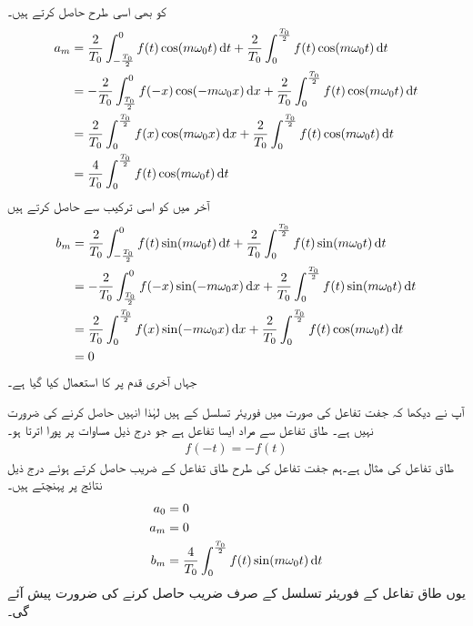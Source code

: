  کو بھی اسی طرح حاصل کرتے ہیں۔
\begin{gather}
\begin{aligned}
a_m&=\frac{2}{T_0}\int_{-\frac{T_0}{2}}^{0}f(t) \cos (m \omega_0 t) \dif t+\frac{2}{T_0}\int_{0}^{\frac{T_0}{2}}f(t) \cos (m \omega_0 t) \dif t\\
&=-\frac{2}{T_0}\int_{\frac{T_0}{2}}^{0}f(-x) \cos (-m \omega_0 x) \dif x+\frac{2}{T_0}\int_{0}^{\frac{T_0}{2}}f(t) \cos (m \omega_0 t) \dif t\\
&=\frac{2}{T_0}\int_0^{\frac{T_0}{2}}f(x) \cos (m \omega_0 x) \dif x+\frac{2}{T_0}\int_{0}^{\frac{T_0}{2}}f(t) \cos (m \omega_0 t) \dif t\\
&=\frac{4}{T_0}\int_{0}^{\frac{T_0}{2}}f(t) \cos (m \omega_0 t) \dif t
\end{aligned}
\end{gather}
آخر میں  کو اسی ترکیب سے حاصل کرتے ہیں
\begin{gather}
\begin{aligned}
b_m&=\frac{2}{T_0}\int_{-\frac{T_0}{2}}^{0}f(t) \sin (m \omega_0 t) \dif t+\frac{2}{T_0}\int_{0}^{\frac{T_0}{2}}f(t) \sin (m \omega_0 t) \dif t\\
&=-\frac{2}{T_0}\int_{\frac{T_0}{2}}^{0}f(-x) \sin(-m \omega_0 x) \dif x+\frac{2}{T_0}\int_{0}^{\frac{T_0}{2}}f(t) \sin (m \omega_0 t) \dif t\\
&=\frac{2}{T_0}\int_0^{\frac{T_0}{2}}f(x) \sin (-m \omega_0 x) \dif x+\frac{2}{T_0}\int_{0}^{\frac{T_0}{2}}f(t) \cos (m \omega_0 t) \dif t\\
&=0
\end{aligned}
\end{gather}
جہاں آخری قدم پر  کا استعمال کیا گیا ہے۔

آپ نے دیکھا کہ جفت تفاعل کی صورت میں فوریئر تسلسل کے  ہیں لہٰذا انہیں حاصل کرنے کی ضرورت نہیں ہے۔
طاق تفاعل سے مراد ایسا تفاعل ہے جو درج ذیل مساوات پر پورا اترتا ہو۔
\begin{align}
f(-t)=-f(t)
\end{align}
طاق تفاعل کی مثال  ہے۔ہم جفت تفاعل کی طرح طاق تفاعل کے  ضریب  حاصل کرتے ہوئے درج ذیل نتائج پر پہنچتے ہیں۔
\begin{gather}
\begin{aligned}
a_0&=0\\
a_m&=0\\
b_m&=\frac{4}{T_0}\int_{0}^{\frac{T_0}{2}}f(t) \sin (m \omega_0 t) \dif t
\end{aligned}
\end{gather}
یوں طاق تفاعل کے فوریئر تسلسل کے صرف   ضریب  حاصل کرنے کی ضرورت پیش آئے گی۔

